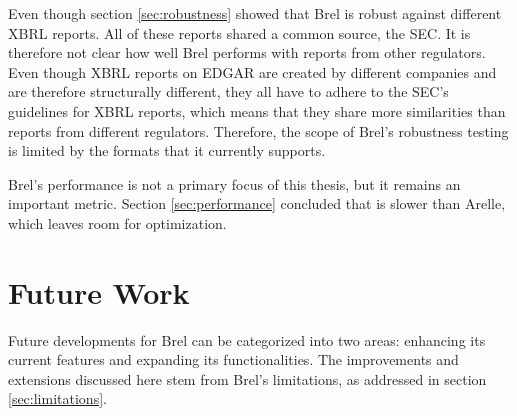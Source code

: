 Even though section \ref{sec:robustness} showed that Brel is robust against different XBRL reports.
All of these reports shared a common source, the SEC.
It is therefore not clear how well Brel performs with reports from other regulators.
Even though XBRL reports on EDGAR are created by different companies and are therefore structurally different,
they all have to adhere to the SEC's guidelines for XBRL reports, 
which means that they share more similarities than reports from different regulators.
Therefore, the scope of Brel's robustness testing is limited by the formats that it currently supports.

Brel's performance is not a primary focus of this thesis, but it remains an important metric.
Section \ref{sec:performance} concluded that is slower than Arelle, which leaves room for optimization.


\section{Future Work}

Future developments for Brel can be categorized into two areas: 
enhancing its current features and expanding its functionalities. 
The improvements and extensions discussed here stem from Brel's limitations, 
as addressed in section \ref{sec:limitations}.



